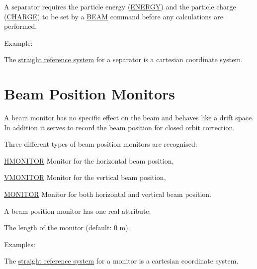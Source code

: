 A separator requires the particle energy
(\href{beam.html#energy}{ENERGY}) and the particle charge
(\href{beam.html#charge}{CHARGE}) to be set by a \href{beam.html}{BEAM}
command before any calculations are performed.  

Example: 

The \href{local_system.html#straight}{straight reference system} for a
separator is a cartesian coordinate system.   


\section{Beam Position Monitors}
\label{sec:monitor}

A beam monitor has no specific effect on the beam and behaves like a
drift space. 
In addition it serves to record the beam position for closed orbit
correction.

Three different types of beam position monitors are recognised:  

\begin{madlist}
   \item{\href{hmon}{HMONITOR}} Monitor for the horizontal beam position, 
   \item{\href{vmon}{VMONITOR}} Monitor for the vertical beam position, 
   \item{\href{mon}{MONITOR}} Monitor for both horizontal and vertical beam position. 
\end{madlist}


A beam position monitor has one real attribute: 
\begin{madlist}
    The length of the monitor (default: 0 m). 
\end{madlist}

Examples: 

The \href{local_system.html#straight}{straight reference system} for a
monitor is a cartesian coordinate system.  

